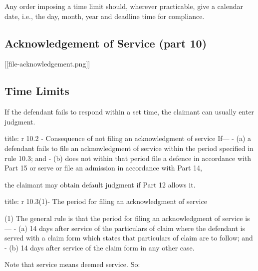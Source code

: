\documentclass[
]{article}
\newenvironment{Shaded}{}{}
\newcommand{\NormalTok}[1]{#1}
\begin{document}
Any order imposing a time limit should, wherever practicable, give a
calendar date, i.e., the day, month, year and deadline time for
compliance.

\hypertarget{acknowledgement-of-service-part-10}{%
\subsection{Acknowledgement of Service (part
10)}\label{acknowledgement-of-service-part-10}}

{[}{[}file-acknowledgement.png{]}{]}

\hypertarget{time-limits}{%
\subsection{Time Limits}\label{time-limits}}

If the defendant fails to respond within a set time, the claimant can
usually enter judgment.

\begin{Shaded}
\begin{Highlighting}[]
\NormalTok{title: r 10.2 {-} Consequence of not filing an acknowledgment of service}
\NormalTok{If—}
\NormalTok{{-} (a) a defendant fails to file an acknowledgment of service within the period specified in rule 10.3; and}
\NormalTok{{-} (b) does not within that period file a defence in accordance with Part 15 or serve or file an admission in accordance with Part 14, }

\NormalTok{the claimant may obtain default judgment if Part 12 allows it.}
\end{Highlighting}
\end{Shaded}

\begin{Shaded}
\begin{Highlighting}[]
\NormalTok{title: r 10.3(1){-} The period for filing an acknowledgment of service}

\NormalTok{(1) The general rule is that the period for filing an acknowledgment of service is—}
\NormalTok{{-} (a) 14 days after service of the particulars of claim where the defendant is served with a claim form which states that particulars of claim are to follow; and}
\NormalTok{{-} (b) 14 days after service of the claim form in any other case.}
\end{Highlighting}
\end{Shaded}

Note that service means deemed service. So:
\end{document}
